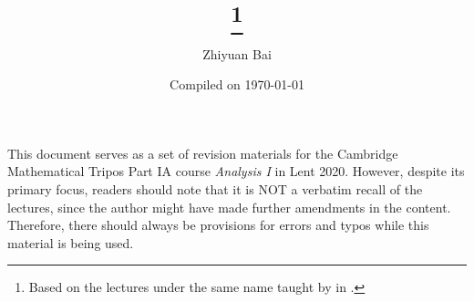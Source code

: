 \documentclass[a4paper]{article}
\title{\triposcourse{}
\thanks{Based on the lectures under the same name taught by \triposlecturer{} in \triposterm{}.}}
\author{Zhiyuan Bai}
\date{Compiled on \today}
\newcommand{\triposcourse}{Analysis I}
\newcommand{\triposterm}{Lent 2020}
\newcommand{\tripospart}{IA}
\theoremstyle{plain}
\theoremstyle{definition}
\theoremstyle{remark}
\begin{document}
    \maketitle
    This document serves as a set of revision materials for the Cambridge Mathematical Tripos Part \tripospart{} course \textit{\triposcourse{}} in \triposterm{}.
    However, despite its primary focus, readers should note that it is NOT a verbatim recall of the lectures, since the author might have made further amendments in the content.
    Therefore, there should always be provisions for errors and typos while this material is being used.
    \tableofcontents
    
    
    
    
    
    
    
    
\end{document}
